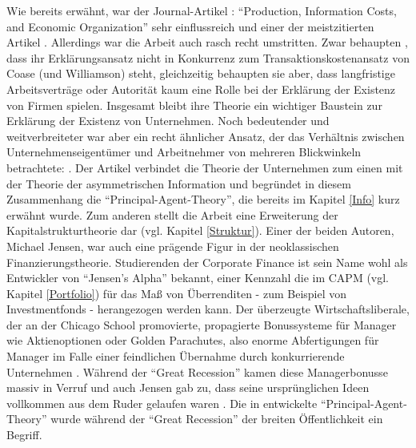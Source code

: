 Wie bereits erwähnt, war der Journal-Artikel \textcite{Alchian1972}: "`Production, Information Costs, and Economic Organization"' sehr einflussreich und einer der meistzitierten Artikel \parencite[S. 192]{Kim2006}. Allerdings war die Arbeit auch rasch recht umstritten. Zwar behaupten \textcite[S. 783]{Alchian1972}, dass ihr Erklärungsansatz nicht in Konkurrenz zum Transaktionskostenansatz von Coase (und Williamson) steht, gleichzeitig behaupten sie aber, dass langfristige Arbeitsverträge \parencite[S. 784]{Alchian1972} oder Autorität kaum eine Rolle bei der Erklärung der Existenz von Firmen spielen. Insgesamt bleibt ihre Theorie ein wichtiger Baustein zur Erklärung der Existenz von Unternehmen. Noch bedeutender und weitverbreiteter war aber ein recht ähnlicher Ansatz, der das Verhältnis zwischen Unternehmenseigentümer und Arbeitnehmer von mehreren Blickwinkeln betrachtete: \textcite{Jensen1976}. Der Artikel verbindet die Theorie der Unternehmen zum einen mit der Theorie der asymmetrischen Information und begründet in diesem Zusammenhang die "`Principal-Agent-Theory"', die bereits im Kapitel \ref{Info} kurz erwähnt wurde. Zum anderen stellt die Arbeit eine Erweiterung der Kapitalstrukturtheorie dar (vgl. Kapitel \ref{Struktur}). Einer der beiden Autoren, Michael Jensen, war auch eine prägende Figur in der neoklassischen Finanzierungstheorie. Studierenden der Corporate Finance ist sein Name wohl als Entwickler von "`Jensen's Alpha"' bekannt, einer Kennzahl die im CAPM (vgl. Kapitel \ref{Portfolio}) für das Maß von Überrenditen - zum Beispiel von Investmentfonds - herangezogen werden kann. Der überzeugte Wirtschaftsliberale, der an der Chicago School promovierte, propagierte Bonussysteme für Manager wie Aktienoptionen oder Golden Parachutes, also enorme Abfertigungen für Manager im Falle einer feindlichen Übernahme durch konkurrierende Unternehmen \parencite{Rosenwald2024}. Während der "`Great Recession"' kamen diese Managerbonusse massiv in Verruf und auch Jensen gab zu, dass seine ursprünglichen Ideen vollkommen aus dem Ruder gelaufen waren \parencite{Jensen2010}. Die in \textcite{Jensen1976} entwickelte "`Principal-Agent-Theory"' wurde während der "`Great Recession"' der breiten Öffentlichkeit ein Begriff.

